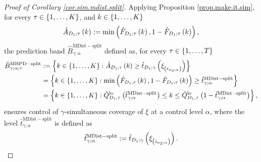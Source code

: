 \documentclass[11pt]{article}
\begin{document}
\begin{proof}[Proof of Corollary \ref{cor.sim.mdist.split}]
Applying Proposition \ref{prop.make.it.sim},
for every $\tau \in \left\{ 1, \ldots, K \right\}$, and $k \in \left\{ 1, \ldots, K \right\}$
\begin{align}
\label{eq.sim.ecdf}
    \hat{A}_{D_1; \tau}\left( k \right)
    := \min\left( \hat{F}_{D_1; \tau} \left( k \right), 1 - \hat{F}_{D_1; \tau} \left( k \right) \right),
\end{align}
%
%
%
the prediction band $\hat{B}^{\mathrm{MDist-split}}_{\gamma; \alpha}$ defined as,
for every $\tau \in \left\{ 1, \ldots, T \right\}$
\begin{align*}
    \hat{B}_{\gamma; \alpha; \tau}^{\mathrm{MHPD-split}}
    &
    :=
    \left\{ 
        k \in \left\{ 1, \ldots, K \right\} :
        \hat{A}_{D_1; \tau} \left( k \right)
        \geq
        \hat{t}_{D_1; \gamma} \left( \xi_{\left( i_{n_2; \alpha} \right)} \right)
     \right\}
    \\
    &
    = \left\{ 
        k \in \left\{ 1, \ldots, K \right\} :
        \min \left( 
            \hat{F}_{D_1; \tau} \left( k \right),
            1 - \hat{F}_{D_1; \tau} \left( k \right)   
         \right)
        \geq \hat{t}_{\gamma; \alpha}^{\mathrm{MDist-split}}
     \right\}
    \\
    &
    =
    \left\{ 
        k \in \left\{ 1, \ldots, K \right\} :
        \hat{Q}_{D_1, \tau}^{\mathrm{lo}}
        \left( 
            \hat{t}_{\gamma; \alpha}^{\mathrm{MDist-split}}
         \right)
        \leq k
        \leq \hat{Q}_{D_1, \tau}^{\mathrm{lo}}
        \left( 
            1 - \hat{t}_{\gamma; \alpha}^{\mathrm{MDist-split}}
         \right)
     \right\},
\end{align*}
ensures control of $\gamma$-simultaneous coverage of $\xi$ at a control level $\alpha$,
where the level $\hat{t}_{\gamma; \alpha}^{\mathrm{MDist-split}}$ is defined as
\begin{align}
    \label{eq.threshold.sim.mdist.split}
    \hat{t}_{\gamma; \alpha}^{\mathrm{MDist-split}} :=
    \hat{t}_{D_1; \gamma} \left( \xi_{\left( i_{n_2; \alpha} \right)} \right).
\end{align}
\end{proof}
\end{document}
